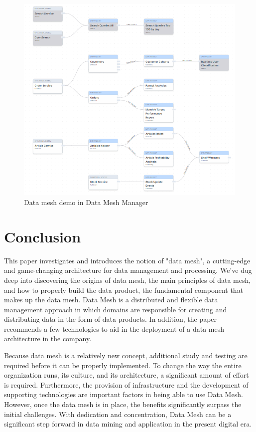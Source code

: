 \documentclass[12pt, a4paper]{book}
\begin{document}
\begin{figure}[h]
	\begin{framed}
		\centering
		\includegraphics[width=15cm]{DataMeshManagerDemo.png}
		\caption{Data mesh demo in Data Mesh Manager}
		\label{DataMeshManagerDemo}
	\end{framed}
\end{figure}

\chapter{Conclusion}
This paper investigates and introduces the notion of "data mesh", a cutting-edge and game-changing architecture for data management and processing. We've dug deep into discovering the origins of data mesh, the main principles of data mesh, and how to properly build the data product, the fundamental component that makes up the data mesh. Data Mesh is a distributed and flexible data management approach in which domains are responsible for creating and distributing data in the form of data products. In addition, the paper recommends a few technologies to aid in the deployment of a data mesh architecture in the company.

Because data mesh is a relatively new concept, additional study and testing are required before it can be properly implemented. To change the way the entire organization runs, its culture, and its architecture, a significant amount of effort is required. Furthermore, the provision of infrastructure and the development of supporting technologies are important factors in being able to use Data Mesh. However, once the data mesh is in place, the benefits significantly surpass the initial challenges. With dedication and concentration, Data Mesh can be a significant step forward in data mining and application in the present digital era.


\begingroup
\backmatter
{}
\renewcommand\bibname{References}
\endgroup

\clearpage
\end{document}
